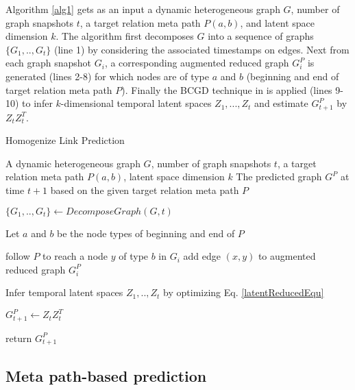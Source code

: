 

Algorithm \ref{alg1} gets as an input a dynamic heterogeneous graph $G$, number of graph snapshots $t$, a target relation meta path $P(a,b)$, and latent space dimension $k$. The algorithm first decomposes $G$ into a sequence of graphs $\{G_1, .., G_t\}$ (line 1) by considering the associated timestamps on edges. Next from each graph snapshot $G_i$, a corresponding augmented reduced graph $G^P_i$ is generated (lines 2-8) for which nodes are of type $a$ and $b$ (beginning and end of target relation meta path $P$). Finally the BCGD technique in \cite{Zhu2016} is applied (lines 9-10) to infer $k$-dimensional temporal latent spaces $Z_1, ...,Z_t$ and estimate $G^P_{t+1}$ by $Z_tZ_t^T$.


\begin{algorithm}[t]
\caption{Homogenize Link Prediction}\label{alg1}
\begin{algorithmic}[1]
\REQUIRE A dynamic heterogeneous graph $G$, number of graph snapshots $t$, a target relation meta path $P(a,b)$, latent space dimension $k$
\ENSURE The predicted graph $G^P$ at time $t+1$ based on the given target relation meta path $P$

\STATE $\{G_1, .., G_t\} \leftarrow DecomposeGraph(G, t)$

    \STATE Let $a$ and $b$ be the node types of beginning and end of $P$
    
        \STATE follow $P$ to reach a node $y$ of type $b$ in $G_i$ 
        \STATE add edge $(x,y)$ to augmented reduced graph $G_i^P$ 
\ENDFOR

\ENDFOR
\STATE Infer temporal latent spaces $Z_1, .., Z_t$ by optimizing Eq. \ref{latentReducedEqu}

\STATE $G^P_{t+1} \leftarrow Z_tZ^T_t$ 

\STATE return $G^P_{t+1}$
\end{algorithmic}
\end{algorithm}



\subsection{Meta path-based prediction}

